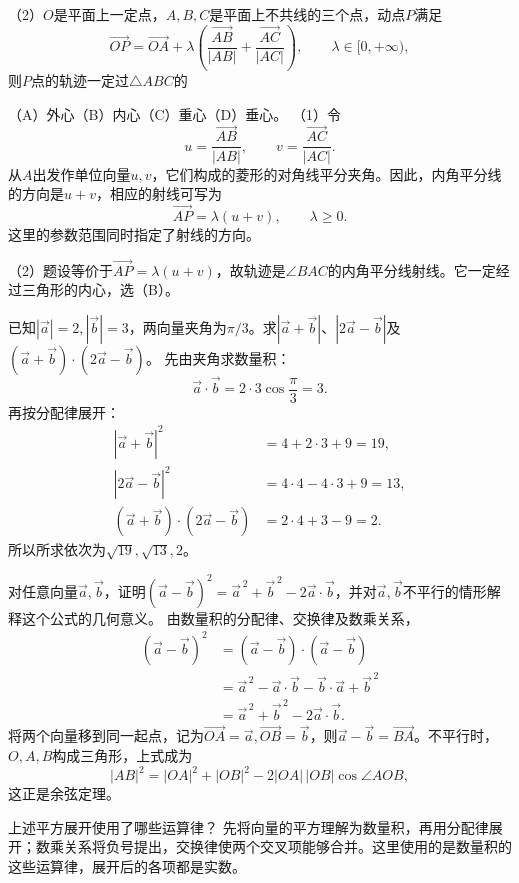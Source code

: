 （2）\(O\)是平面上一定点，\(A,B,C\)是平面上不共线的三个点，动点\(P\)满足
\[
 \vec{OP}=\vec{OA}+\lambda\left(\frac{\vec{AB}}{|AB|}+\frac{\vec{AC}}{|AC|}\right),
 \qquad\lambda\in[0,+\infty),
\]
则\(P\)点的轨迹一定过\(\triangle ABC\)的

（A）外心\quad （B）内心\quad （C）重心\quad （D）垂心。
\solutionanswer
（1）令
\[
u=\frac{\vec{AB}}{|AB|},\qquad v=\frac{\vec{AC}}{|AC|}.
\]
从\(A\)出发作单位向量\(u,v\)，它们构成的菱形的对角线平分夹角。因此，内角平分线的方向是\(u+v\)，相应的射线可写为
\[
\vec{AP}=\lambda(u+v),\qquad \lambda\ge0.
\]
这里的参数范围同时指定了射线的方向。

（2）题设等价于\(\vec{AP}=\lambda(u+v)\)，故轨迹是\(\angle BAC\)的内角平分线射线。它一定经过三角形的内心，选（B）。


已知\(|\vec a|=2,|\vec b|=3\)，两向量夹角为\(\pi/3\)。求\(|\vec a+\vec b|\)、\(|2\vec a-\vec b|\)及\((\vec a+\vec b)\cdot(2\vec a-\vec b)\)。
\solutionanswer
先由夹角求数量积：
\[
\vec a\cdot\vec b=2\cdot3\cos\frac\pi3=3.
\]
再按分配律展开：
\[
\begin{aligned}
|\vec a+\vec b|^2&=4+2\cdot3+9=19,\\
|2\vec a-\vec b|^2&=4\cdot4-4\cdot3+9=13,\\
(\vec a+\vec b)\cdot(2\vec a-\vec b)&=2\cdot4+3-9=2.
\end{aligned}
\]
所以所求依次为\(\sqrt{19},\sqrt{13},2\)。


对任意向量\(\vec a,\vec b\)，证明\((\vec a-\vec b)^2=\vec a^{\,2}+\vec b^{\,2}-2\vec a\cdot\vec b\)，并对\(\vec a,\vec b\)不平行的情形解释这个公式的几何意义。
\solutionanswer
由数量积的分配律、交换律及数乘关系，
\[
\begin{aligned}
(\vec a-\vec b)^2
&=(\vec a-\vec b)\cdot(\vec a-\vec b)\\
&=\vec a^{\,2}-\vec a\cdot\vec b-\vec b\cdot\vec a+\vec b^{\,2}\\
&=\vec a^{\,2}+\vec b^{\,2}-2\vec a\cdot\vec b.
\end{aligned}
\]
将两个向量移到同一起点，记为\(\vec{OA}=\vec a,\vec{OB}=\vec b\)，则\(\vec a-\vec b=\vec{BA}\)。不平行时，\(O,A,B\)构成三角形，上式成为
\[
|AB|^2=|OA|^2+|OB|^2-2|OA|\,|OB|\cos\angle AOB,
\]
这正是余弦定理。


上述平方展开使用了哪些运算律？
\solutionanswer
先将向量的平方理解为数量积，再用分配律展开；数乘关系将负号提出，交换律使两个交叉项能够合并。这里使用的是数量积的这些运算律，展开后的各项都是实数。


